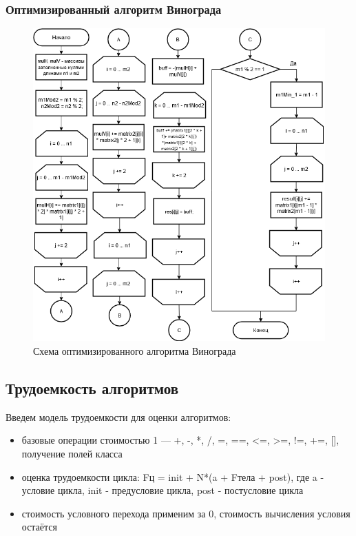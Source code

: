 \documentclass[12pt,a4paper]{article}
\begin{document}
\subsubsection{Оптимизированный алгоритм Винограда}
\begin{figure}[!htbp]
\centering
\includegraphics[scale=0.9]{GrapeOpt)}
\caption{Схема оптимизированного алгоритма Винограда}
\label{fig:mpr}
\end{figure}
\clearpage
\subsection{Трудоемкость алгоритмов}
Введем модель трудоемкости для оценки алгоритмов:
\begin{itemize}
	\item базовые операции стоимостью 1 — +, -, *, /, =, ==, <=, >=, !=, +=, [], получение полей класса
	\item оценка трудоемкости цикла: Fц = init +  N*(a + Fтела + post), где a - условие цикла, init - предусловие цикла, post - постусловие цикла
	\item стоимость условного перехода применим за 0, стоимость вычисления условия остаётся
\end{itemize}
\end{document}
